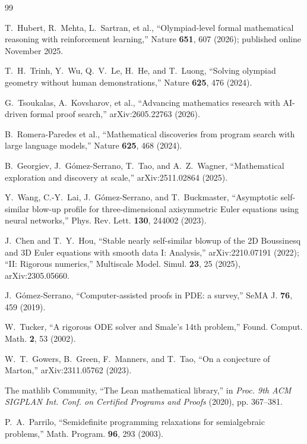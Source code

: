 \documentclass[11pt,letterpaper]{article}
\begin{document}
\begin{thebibliography}{99}\setlength{\itemsep}{1pt}\small

 T.~Hubert, R.~Mehta, L.~Sartran, et al., ``Olympiad-level formal mathematical reasoning with reinforcement learning,'' Nature \textbf{651}, 607 (2026); published online November 2025.

 T.~H.~Trinh, Y.~Wu, Q.~V.~Le, H.~He, and T.~Luong, ``Solving olympiad geometry without human demonstrations,'' Nature \textbf{625}, 476 (2024).

 G.~Tsoukalas, A.~Kovsharov, et al., ``Advancing mathematics research with AI-driven formal proof search,'' arXiv:2605.22763 (2026).

 B.~Romera-Paredes et al., ``Mathematical discoveries from program search with large language models,'' Nature \textbf{625}, 468 (2024).

 B.~Georgiev, J.~G\'omez-Serrano, T.~Tao, and A.~Z.~Wagner, ``Mathematical exploration and discovery at scale,'' arXiv:2511.02864 (2025).

 Y.~Wang, C.-Y.~Lai, J.~G\'omez-Serrano, and T.~Buckmaster, ``Asymptotic self-similar blow-up profile for three-dimensional axisymmetric Euler equations using neural networks,'' Phys. Rev. Lett. \textbf{130}, 244002 (2023).

 J.~Chen and T.~Y.~Hou, ``Stable nearly self-similar blowup of the 2D Boussinesq and 3D Euler equations with smooth data I: Analysis,'' arXiv:2210.07191 (2022); ``II: Rigorous numerics,'' Multiscale Model. Simul. \textbf{23}, 25 (2025), arXiv:2305.05660.

 J.~G\'omez-Serrano, ``Computer-assisted proofs in PDE: a survey,'' SeMA J. \textbf{76}, 459 (2019).

 W.~Tucker, ``A rigorous ODE solver and Smale's 14th problem,'' Found. Comput. Math. \textbf{2}, 53 (2002).

 W.~T.~Gowers, B.~Green, F.~Manners, and T.~Tao, ``On a conjecture of Marton,'' arXiv:2311.05762 (2023).

 The mathlib Community, ``The Lean mathematical library,'' in \emph{Proc. 9th ACM SIGPLAN Int. Conf. on Certified Programs and Proofs} (2020), pp. 367--381.

 P.~A.~Parrilo, ``Semidefinite programming relaxations for semialgebraic problems,'' Math. Program. \textbf{96}, 293 (2003).


\end{thebibliography}
\end{document}
